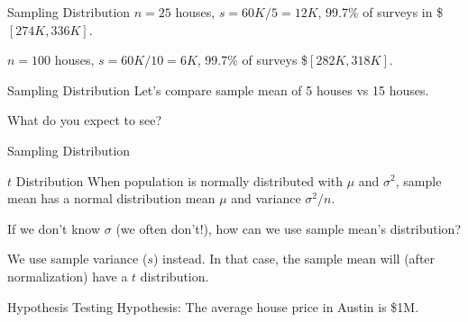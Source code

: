 \documentclass{beamer}\usepackage[]{graphicx}\usepackage[]{color}
\begin{document}
\begin{darkframes}
\begin{frame}[label=lists]{Sampling Distribution}
    $n=25$ houses, $s=60K/5=12K$, 99.7\% of surveys in \$$[274K, 336K]$.
    
	$n=100$ houses, $s=60K/10=6K$, 99.7\% of surveys \$$[282K, 318K]$.
    
    \end{frame}
    
    
    \begin{frame}[label=lists]{Sampling Distribution}
		Let's compare sample mean of 5 houses vs 15 houses. \newline
		
		What do you expect to see?
	\end{frame}	
	
	\begin{frame}[label=lists]{Sampling Distribution}
		\begin{figure} 
				\centering
				\setlength\fboxsep{0pt}
				\setlength\fboxrule{0.5pt} 
			\end{figure} 	
	\end{frame}	
    
    
    \begin{frame}[label=lists]{$t$ Distribution}
		When population is normally distributed with $\mu$ and $\sigma^2$, sample mean has a normal distribution mean $\mu$ and variance $\sigma^2/n$. \newline
		
		If we don't know $\sigma$ (we often don't!), how can we use sample mean's distribution? \newline
		
		We use sample variance ($s$) instead. In that case, the sample mean will (after normalization) have a $t$ distribution.
	\end{frame}	
    
    
    
    \begin{frame}[label=lists]{Hypothesis Testing}
    Hypothesis: The average house price in Austin is \$1M.
    

\end{frame}
\end{darkframes}
\end{document}
